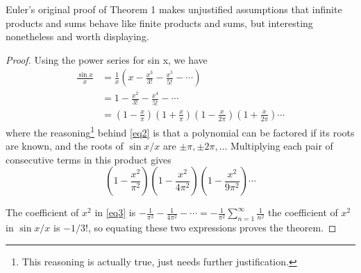 \documentclass{article}
\begin{document}
Euler's original proof of Theorem 1 makes unjustified assumptions that infinite products and sums behave like finite products and sums, but interesting nonetheless and worth displaying.

\begin{proof}
Using the power series for sin x, we have
\begin{align}
    \frac{\sin x}{x} & = \frac{1}{x} \left(x-\frac{x^3}{3!}-\frac{x^5}{5!}-\cdots \right) \nonumber \\
    & = 1 - \frac{x^2}{3!} - \frac{x^4}{5!} - \cdots \nonumber \\
    & = \left(1-\frac{x}{\pi}\right) \left(1+\frac{x}{\pi}\right) \left(1-\frac{x}{2\pi}\right) \left(1+\frac{x}{2\pi}\right)\cdots \label{eq2}
\end{align}
where the reasoning\footnote{This reasoning is actually true, just needs further justification.} behind \eqref{eq2} is that a polynomial can be factored if its roots are known, and the roots of \(\sin x/x\) are \(\pm \pi, \pm 2\pi, \ldots\) Multiplying each pair of consecutive terms in this product gives
\begin{equation}
\left(1-\frac{x^2}{\pi^2}\right) \left(1-\frac{x^2}{4\pi^2}\right) \left(1-\frac{x^2}{9\pi^2}\right) \cdots \label{eq3}
\end{equation}

The coefficient of \(x^2\) in \eqref{eq3} is
\(\displaystyle - \frac{1}{\pi^2} - \frac{1}{4\pi^2}{} - \cdots = -\frac{1}{\pi^2} \sum\limits_{n=1}^{\infty} \frac{1}{n^2}\) the coefficient of \(x^2\) in \(\sin x/x\) is \(-1/3!\), so equating these two expressions proves the theorem.
\end{proof}

\printindex
\end{document}
